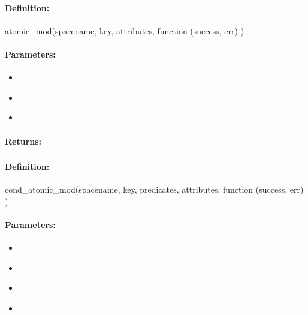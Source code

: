 \paragraph{Definition:}
\begin{javascriptcode}
atomic_mod(spacename, key, attributes, function (success, err) {})
\end{javascriptcode}
\paragraph{Parameters:}
\begin{itemize}[noitemsep]
\item {}\\

\item {}\\

\item {}\\

\end{itemize}

\paragraph{Returns:}


\pagebreak
\subsubsection{}
\label{api:nodejs:cond_atomic_mod}


\paragraph{Definition:}
\begin{javascriptcode}
cond_atomic_mod(spacename, key, predicates, attributes, function (success, err) {})
\end{javascriptcode}
\paragraph{Parameters:}
\begin{itemize}[noitemsep]
\item {}\\

\item {}\\

\item {}\\

\item {}\\

\end{itemize}


